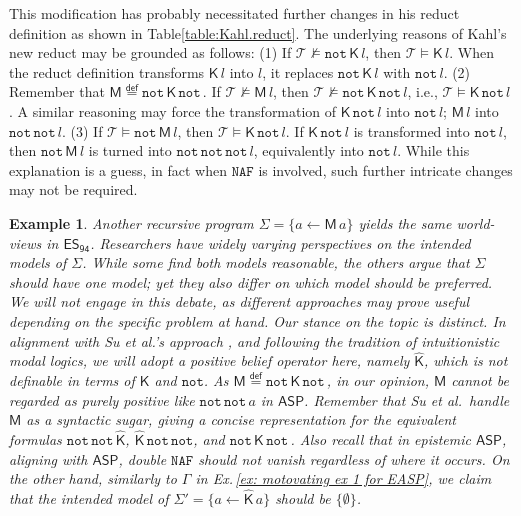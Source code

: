 \documentclass[submission,copyright,creativecommons]{eptcs}
\newcommand{\eqdef}  { \stackrel{\mathsf{def}}{=} }
\newcommand{\set}[1]  { \{ #1 \} }
\newcommand{\logic}[1]  { \ensuremath{\mathsf{#1}} }
\newcommand{\ASP}  { \logic{ASP} }
\newcommand{\naf}  { \texttt{NAF} }
\newcommand{\lpnot}  { \mathtt{not} \, }
\newcommand{\notlp}  { \mathtt{not} }
\newcommand{\K}  { \mathsf{K} }
\newcommand{\M}  { \mathsf{M} }
\newcommand{\Khat}  { \hat{\mathsf{K}} }
\newcommand{\ESdoksandort}  { \logic{ES_{\scriptscriptstyle{94}} } }
\newtheorem{example}{Example}
\begin{document}
This modification has probably necessitated further changes in his reduct definition 
as shown in Table\ref{table:Kahl.reduct}. The underlying reasons of Kahl's new reduct 
\cite{kahl2014refining} may be grounded as follows: 
(1) If $\mathcal T \not\models \lpnot\K\, l $, then $\mathcal T \models \K\, l$. When
the reduct definition transforms $\K\,l$ into $l$, it  
replaces $\lpnot \K\, l$ with $\lpnot l$. 
(2) Remember that $\M \eqdef \lpnot \K\,\lpnot$. If $\mathcal T \not\models \M\, l$, then
$\mathcal T \not\models \lpnot \K\, \lpnot l$, i.e., $\mathcal T \models \K\, \lpnot l$. 
A similar reasoning may force the transformation of $\K\,\lpnot l$ into $\lpnot l$; $\M\, l$ into $\lpnot \lpnot l$. 
(3) If $\mathcal T \models \lpnot \M\,l$, then $\mathcal T \models \K\,\lpnot l$. 
If $\K\,\lpnot l$ is transformed into  $\lpnot l$, then $\lpnot \M\,l$ is turned into
$\lpnot \lpnot \lpnot l$, equivalently \cite{ASP-strong.equivalence} 
into $\lpnot l$. While this explanation is a guess,
in fact when $\naf$ is involved, such further intricate changes may not be required.
%
\begin{example}
\label{ex: motovating ex 2 for EASP} \normalfont
Another recursive program $\Sigma =\set{a \leftarrow \M\,a}$ yields the same world-views in $\ESdoksandort$. Researchers have widely varying perspectives on the intended models of $\Sigma$.
While some find both models reasonable, the others argue that $\Sigma$ should 
have one model; yet they also differ on which model should be preferred. We will not engage in
this debate, as different approaches may prove useful depending on the specific problem 
at hand. Our stance on the topic is distinct. In alignment with Su et al.'s
approach \cite{SuAI20}, and following the tradition of intuitionistic modal logics, 
we will adopt a positive belief operator here, namely $\Khat$, 
which is not definable in terms of $\K$ and $\notlp$. As $\M \eqdef \lpnot \K\,\lpnot$, in our opinion,
$\M$ cannot be regarded as purely positive like $\lpnot\lpnot a$ in $\ASP$. Remember that Su et al.\ handle $\M$ as a syntactic sugar, giving a concise representation for the equivalent formulas 
$\lpnot \lpnot \Khat$, $\Khat\,\lpnot\notlp$, and $\lpnot \K\,\lpnot$. 
Also recall that in epistemic $\ASP$, aligning with  
$\ASP$, double $\naf$
should not vanish regardless of where it occurs. On the other hand, 
similarly to $\Gamma$ in Ex.\,\ref{ex: motovating ex 1 for EASP},
we claim that the intended model of $\Sigma'=\set{a\leftarrow \Khat\, a}$ should
be $\set{\emptyset}$.
\end{example}
\end{document}
